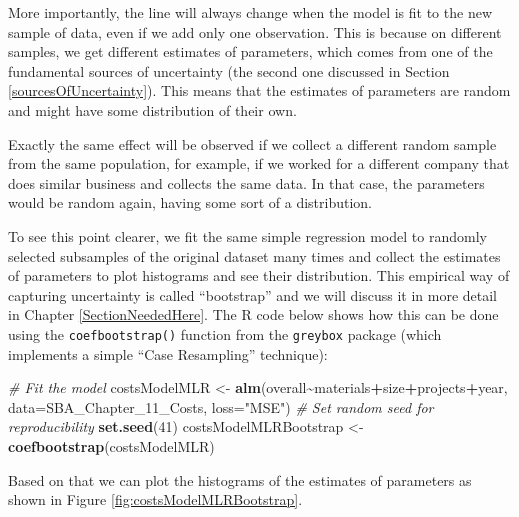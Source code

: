 \documentclass[
]{book}
\newenvironment{Shaded}{\begin{snugshade}}{\end{snugshade}}
\newcommand{\AttributeTok}[1]{\textcolor[rgb]{0.13,0.29,0.53}{#1}}
\newcommand{\CommentTok}[1]{\textcolor[rgb]{0.56,0.35,0.01}{\textit{#1}}}
\newcommand{\DecValTok}[1]{\textcolor[rgb]{0.00,0.00,0.81}{#1}}
\newcommand{\FunctionTok}[1]{\textcolor[rgb]{0.13,0.29,0.53}{\textbf{#1}}}
\newcommand{\NormalTok}[1]{#1}
\newcommand{\OtherTok}[1]{\textcolor[rgb]{0.56,0.35,0.01}{#1}}
\newcommand{\SpecialCharTok}[1]{\textcolor[rgb]{0.81,0.36,0.00}{\textbf{#1}}}
\newcommand{\StringTok}[1]{\textcolor[rgb]{0.31,0.60,0.02}{#1}}
\theoremstyle{definition}
\theoremstyle{definition}
\theoremstyle{definition}
\theoremstyle{definition}
\theoremstyle{remark}
\begin{document}
More importantly, the line will always change when the model is fit to the new sample of data, even if we add only one observation. This is because on different samples, we get different estimates of parameters, which comes from one of the fundamental sources of uncertainty (the second one discussed in Section \ref{sourcesOfUncertainty}). This means that the estimates of parameters are random and might have some distribution of their own.

Exactly the same effect will be observed if we collect a different random sample from the same population, for example, if we worked for a different company that does similar business and collects the same data. In that case, the parameters would be random again, having some sort of a distribution.

To see this point clearer, we fit the same simple regression model to randomly selected subsamples of the original dataset many times and collect the estimates of parameters to plot histograms and see their distribution. This empirical way of capturing uncertainty is called ``bootstrap'' and we will discuss it in more detail in Chapter \ref{SectionNeededHere}. The R code below shows how this can be done using the \texttt{coefbootstrap()} function from the \texttt{greybox} package (which implements a simple ``Case Resampling'' technique):

\begin{Shaded}
\begin{Highlighting}[]
\CommentTok{\# Fit the model}
\NormalTok{costsModelMLR }\OtherTok{\textless{}{-}} \FunctionTok{alm}\NormalTok{(overall}\SpecialCharTok{\textasciitilde{}}\NormalTok{materials}\SpecialCharTok{+}\NormalTok{size}\SpecialCharTok{+}\NormalTok{projects}\SpecialCharTok{+}\NormalTok{year, }\AttributeTok{data=}\NormalTok{SBA\_Chapter\_11\_Costs, }\AttributeTok{loss=}\StringTok{"MSE"}\NormalTok{)}
\CommentTok{\# Set random seed for reproducibility}
\FunctionTok{set.seed}\NormalTok{(}\DecValTok{41}\NormalTok{)}
\NormalTok{costsModelMLRBootstrap }\OtherTok{\textless{}{-}} \FunctionTok{coefbootstrap}\NormalTok{(costsModelMLR)}
\end{Highlighting}
\end{Shaded}

Based on that we can plot the histograms of the estimates of parameters as shown in Figure \ref{fig:costsModelMLRBootstrap}.
\end{document}
